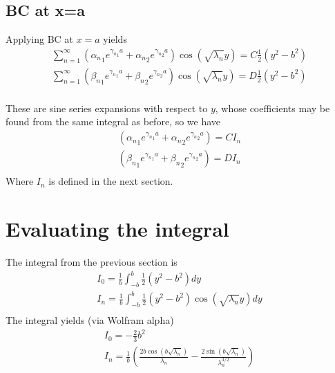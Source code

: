 \documentclass[11pt]{article}
\begin{document}
\subsection{BC at x=a}
Applying BC at $x=a$ yields
\begin{equation}\begin{aligned}
\sum_{n=1}^{\infty} \left( {\alpha_n}_1 e^{{\gamma_n}_1 a} + {\alpha_n}_2 e^{{\gamma_n}_2 a} \right) \cos(\sqrt{\lambda_n} y) = C \frac{1}{2} (y^2 - b^2) \\
\sum_{n=1}^{\infty} \left( {\beta_n}_1  e^{{\gamma_n}_1 a} + {\beta_n}_2  e^{{\gamma_n}_2 a} \right) \cos(\sqrt{\lambda_n} y) = D \frac{1}{2} (y^2 - b^2) \\
\end{aligned} \end{equation}

These are sine series expansions with respect to $y$, whose coefficients may be found from the same integral as before, so we have
\begin{equation}\begin{aligned}
\left( {\alpha_n}_1 e^{{\gamma_n}_1 a} + {\alpha_n}_2 e^{{\gamma_n}_2 a} \right) = C I_n \\
\left( {\beta_n}_1  e^{{\gamma_n}_1 a} + {\beta_n}_2  e^{{\gamma_n}_2 a} \right) = D I_n \\
\end{aligned} \end{equation}
Where $I_n$ is defined in the next section.

\section{Evaluating the integral}
The integral from the previous section is
\begin{equation}\begin{aligned}
I_0 = \frac{1}{b} \int_{-b}^{b} \frac{1}{2} (y^2 - b^2) dy \\
I_n = \frac{1}{b} \int_{-b}^{b} \frac{1}{2} (y^2 - b^2) \cos(\sqrt{\lambda_n} y) dy \\
\end{aligned} \end{equation}
The integral yields (via Wolfram alpha)
\begin{equation}\begin{aligned}
I_0 = - \frac{2}{3} b^2 \\
I_{n} = \frac{1}{b} \left( \frac{2 b \cos{ \left( b \sqrt{\lambda_n} \right) }}{\lambda_n}-\frac{2 \sin{ \left( b \sqrt{\lambda_n} \right) }}{\lambda_n^{3/2}} \right) \\
\end{aligned} \end{equation}
\end{document}
